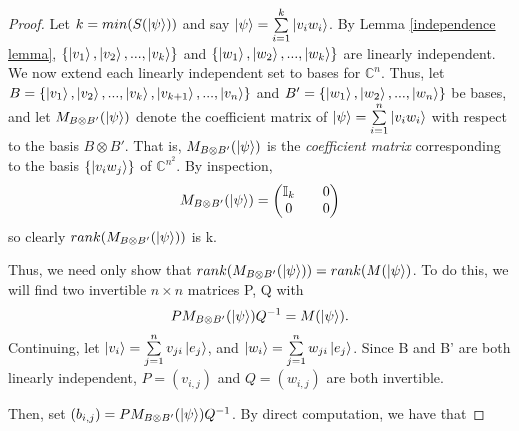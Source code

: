 \begin{proof}
Let $k=min(S(\ket{\psi}))$ and say $\ket{\psi}=\sum\limits_{i=1}^k \ket{v_i w_i}$. By Lemma \ref{independence lemma}, $\{\ket{v_1}, \ket{v_2},...,\ket{v_k}\}$ and $\{\ket{w_1}, \ket{w_2},...,\ket{w_k}\}$ are linearly independent.  We now extend each linearly independent set to bases for $\mathbb{C}^n$. Thus, let $B=\{\ket{v_1}, \ket{v_2},...,\ket{v_k}, \ket{v_{k+1}},...,\ket{v_n}\}$ and $B'=\{\ket{w_1}, \ket{w_2},...,\ket{w_n}\}$ be bases, and let $M_{B \otimes B'}(\ket{\psi})$ denote the coefficient matrix of $\ket{\psi}=\sum\limits_{i=1}^{n}\ket{v_i w_i}$ with respect to the basis $B \otimes B'$. That is, $M_{B \otimes B'}(\ket{\psi})$ is the {\emph{coefficient matrix}} corresponding to the basis $\{\ket{v_i w_j} \}$ of ${\mathbb{C}}^{n^2}$.  By inspection, 
$$M_{B \otimes B'}(\ket{\psi})=\begin{pmatrix}
\mathbb{I}_k && 0 \\
0 && 0
\end{pmatrix}$$
so clearly $rank(M_{B \otimes B'}(\ket{\psi}))$ is k.

Thus, we need only show that $rank(M_{B \otimes B'}(\ket{\psi}))=rank(M(\ket{\psi})$.  To do this, we will find two invertible $n \times n$ matrices P, Q with 
\begin{equation}
PM_{B \otimes B'}(\ket{\psi})Q^{-1}=M(\ket{\psi}).
\end{equation}
Continuing, let $\ket{v_i}=\sum\limits_{j=1}^n v_{ji}\ket{e_j}$, and
$\ket{w_i}=\sum\limits_{j=1}^n w_{ji}\ket{e_j}$.  Since B and B' are both linearly independent, $P=(v_{i,j})$ and $Q=(w_{i,j})$ are both invertible.


Then, set $(b_{i,j})=PM_{B \otimes B'}(\ket{\psi})Q^{-1}$.  By direct computation, we have that
\begin{comment}


\end{comment}
\end{proof}
